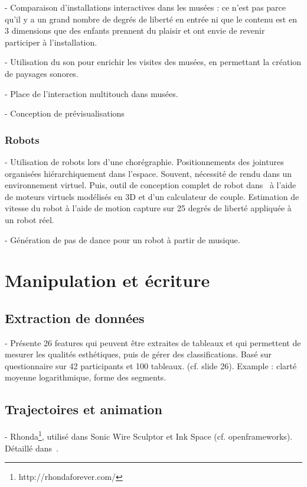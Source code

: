 \documentclass[french,12pt]{article}
\begin{document}
- Comparaison d'installations interactives dans les musées : ce n'est pas parce qu'il y a un grand nombre de degrés de liberté en entrée ni que le contenu est en 3 dimensions que des enfants prennent du plaisir et ont envie de revenir participer à l'installation.
\cite{michael_comparative_2010}

- Utilisation du son pour enrichir les visites des musées, en permettant la création de paysages sonores.
\cite{azough_modeet_2014}

- Place de l'interaction multitouch dans musées.
\cite{kidd_multi-touch_2011}

- Conception de prévisualisations
\cite{jung_storyboarding_2010}

\subsubsection{Robots}
- Utilisation de robots lors d'une chorégraphie. Positionnements des jointures organisées hiérarchiquement dans l'espace. Souvent, nécessité de rendu dans un environnement virtuel. 
\cite{lee_visualization_2013}
Puis, outil de conception complet de robot dans~\cite{lee_virtual_2014} à l'aide de moteurs virtuels modélisés en 3D et d'un calculateur de couple. Estimation de vitesse du robot à l'aide de motion capture sur 25 degrés de liberté appliquée à un robot réel.

- Génération de pas de dance pour un robot à partir de musique.
\cite{seo_autonomous_2013}

\section{Manipulation et écriture}

\subsection{Extraction de données}
- Présente 26 features qui peuvent être extraites de tableaux et qui permettent de mesurer les qualités esthétiques, puis de gérer des classifications. Basé sur questionnaire sur 42 participants et 100 tableaux. \cite{li_aesthetic_2009} (cf. slide 26).
Example : clarté moyenne logarithmique, forme des segments.

\subsection{Trajectoires et animation}
- Rhonda\footnote{http://rhondaforever.com/}, utilisé dans Sonic Wire Sculptor et Ink Space (cf. openframeworks). Détaillé dans~\cite{rasmuson_flying_2013}.
\end{document}
